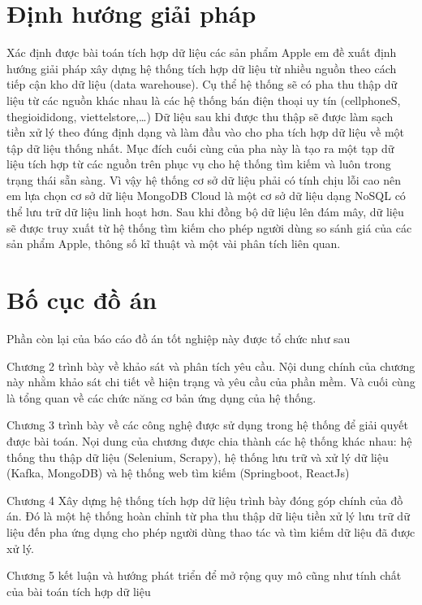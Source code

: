 \documentclass[../DoAn.tex]{subfiles}
\begin{document}
\section{Định hướng giải pháp}
\label{section:1.3}
Xác định được bài toán tích hợp dữ liệu các sản phẩm Apple em đề xuất định hướng giải pháp xây dựng hệ thống tích hợp dữ liệu từ nhiều nguồn theo cách tiếp cận kho dữ liệu (data warehouse). Cụ thể hệ thống sẽ có pha thu thập dữ liệu từ các nguồn khác nhau là các hệ thống bán điện thoại uy tín (cellphoneS, thegioididong, viettelstore,…) Dữ liệu sau khi được thu thập sẽ được làm sạch tiền xử lý theo đúng định dạng và làm đầu vào cho pha tích hợp dữ liệu về một tập dữ liệu thống nhất. Mục đích cuối cùng của pha này là tạo ra một tạp dữ liệu tích hợp từ các nguồn trên phục vụ cho hệ thống tìm kiếm và luôn trong trạng thái sẵn sàng. Vì vậy hệ thống cơ sở dữ liệu phải có tính chịu lỗi cao nên em lựa chọn cơ sở dữ liệu MongoDB Cloud là một cơ sở dữ liệu dạng NoSQL có thể lưu trữ dữ liệu linh hoạt hơn. Sau khi đồng bộ dữ liệu lên đám mây, dữ liệu sẽ được truy xuất từ hệ thống tìm kiếm cho phép người dùng so sánh giá của các sản phẩm Apple, thông số kĩ thuật và một vài phân tích liên quan.

\section{Bố cục đồ án}
\label{section:1.4}
Phần còn lại của báo cáo đồ án tốt nghiệp này được tổ chức như sau 

Chương 2 trình bày về khảo sát và phân tích yêu cầu. Nội dung chính của chương này nhằm khảo sát chi tiết về hiện trạng và yêu cầu của phần mềm. Và cuối cùng là tổng quan về các chức năng cơ bản ứng dụng của hệ thống.

Chương 3 trình bày về các công nghệ được sử dụng trong hệ thống để giải quyết được bài toán. Nọi dung của chương được chia thành các hệ thống khác nhau: hệ thống thu thập dữ liệu (Selenium, Scrapy), hệ thống lưu trữ và xử lý dữ liệu (Kafka, MongoDB) và hệ thống web tìm kiếm (Springboot, ReactJs) 

Chương 4 Xây dựng hệ thống tích hợp dữ liệu trình bày đóng góp chính của đồ án. Đó là một hệ thống hoàn chỉnh từ pha thu thập dữ liệu tiền xử lý lưu trữ dữ liệu đến pha ứng dụng cho phép người dùng thao tác và tìm kiếm dữ liệu đã được xử lý.

Chương 5 kết luận và hướng phát triển để mở rộng quy mô cũng như tính chất của bài toán tích hợp dữ liệu
\end{document}
